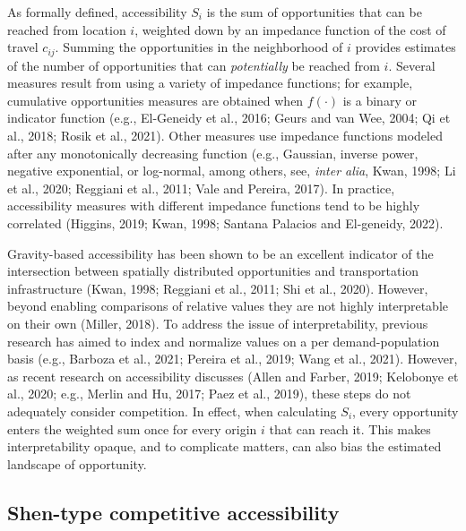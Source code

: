 \documentclass[]{elsarticle} %
\begin{document}
As formally defined, accessibility \(S_i\) is the sum of opportunities
that can be reached from location \(i\), weighted down by an impedance
function of the cost of travel \(c_{ij}\). Summing the opportunities in
the neighborhood of \(i\) provides estimates of the number of
opportunities that can \emph{potentially} be reached from \(i\). Several
measures result from using a variety of impedance functions; for
example, cumulative opportunities measures are obtained when
\(f(\cdot)\) is a binary or indicator function (e.g., El-Geneidy et al.,
2016; Geurs and van Wee, 2004; Qi et al., 2018; Rosik et al., 2021).
Other measures use impedance functions modeled after any monotonically
decreasing function (e.g., Gaussian, inverse power, negative
exponential, or log-normal, among others, see, \emph{inter alia}, Kwan,
1998; Li et al., 2020; Reggiani et al., 2011; Vale and Pereira, 2017).
In practice, accessibility measures with different impedance functions
tend to be highly correlated (Higgins, 2019; Kwan, 1998; Santana
Palacios and El-geneidy, 2022).

Gravity-based accessibility has been shown to be an excellent indicator
of the intersection between spatially distributed opportunities and
transportation infrastructure (Kwan, 1998; Reggiani et al., 2011; Shi et
al., 2020). However, beyond enabling comparisons of relative values they
are not highly interpretable on their own (Miller, 2018). To address the
issue of interpretability, previous research has aimed to index and
normalize values on a per demand-population basis (e.g., Barboza et al.,
2021; Pereira et al., 2019; Wang et al., 2021). However, as recent
research on accessibility discusses (Allen and Farber, 2019; Kelobonye
et al., 2020; e.g., Merlin and Hu, 2017; Paez et al., 2019), these steps
do not adequately consider competition. In effect, when calculating
\(S_i\), every opportunity enters the weighted sum once for every origin
\(i\) that can reach it. This makes interpretability opaque, and to
complicate matters, can also bias the estimated landscape of
opportunity.

\hypertarget{shen-type-competitive-accessibility}{%
\subsection{Shen-type competitive
accessibility}\label{shen-type-competitive-accessibility}}
\end{document}
